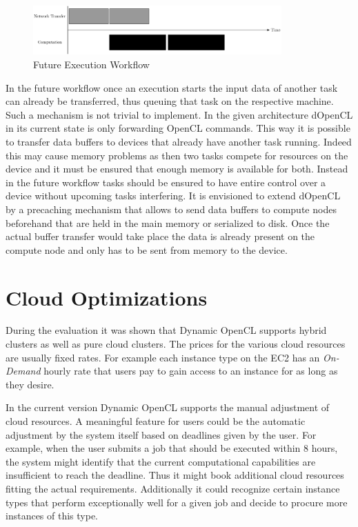 \begin{figure}[!htb]	
	\includegraphics[width=0.85\textwidth]{drawings/active_queue.pdf}
	\centering
	\caption{Future Execution Workflow}
	\label{img:active_queueing}
\end{figure}

In the future workflow once an execution starts the input data of another task can already be transferred, thus queuing that task on the respective machine. Such a mechanism is not trivial to implement. In the given architecture dOpenCL in its current state is only forwarding OpenCL commands. This way it is possible to transfer data buffers to devices that already have another task running. Indeed this may cause memory problems as then two tasks compete for resources on the device and it must be ensured that enough memory is available for both. Instead in the future workflow tasks should be ensured to have entire control over a device without upcoming tasks interfering. It is envisioned to extend dOpenCL by a precaching mechanism that allows to send data buffers to compute nodes beforehand that are held in the main memory or serialized to disk. Once the actual buffer transfer would take place the data is already present on the compute node and only has to be sent from memory to the device.

\section*{Cloud Optimizations}

During the evaluation it was shown that Dynamic OpenCL supports hybrid clusters as well as pure cloud clusters. The prices for the various cloud resources are usually fixed rates. For example each instance type on the EC2 has an \textit{On-Demand} hourly rate that users pay to gain access to an instance for as long as they desire. 

In the current version Dynamic OpenCL supports the manual adjustment of cloud resources. A meaningful feature for users could be the automatic adjustment by the system itself based on deadlines given by the user. For example, when the user submits a job that should be executed within 8 hours, the system might identify that the current computational capabilities are insufficient to reach the deadline. Thus it might book additional cloud resources fitting the actual requirements. Additionally it could recognize certain instance types that perform exceptionally well for a given job and decide to procure more instances of this type.

